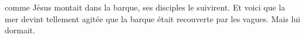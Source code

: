\encetemps comme Jésus montait dans la barque,
	ses disciples le suivirent.
Et voici que la mer devint tellement agitée
	que la barque était recouverte par les vagues.
Mais lui dormait.
